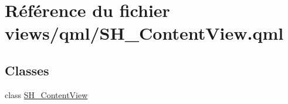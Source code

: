\hypertarget{SH__ContentView_8qml}{\section{Référence du fichier views/qml/\-S\-H\-\_\-\-Content\-View.qml}
\label{SH__ContentView_8qml}
}
\subsection*{Classes}
\begin{DoxyCompactItemize}
\item 
class \hyperlink{classSH__ContentView}{S\-H\-\_\-\-Content\-View}
\end{DoxyCompactItemize}
